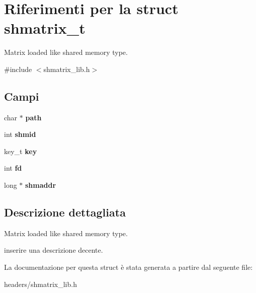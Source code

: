 \hypertarget{structshmatrix__t}{}\section{Riferimenti per la struct shmatrix\+\_\+t}
\label{structshmatrix__t}


Matrix loaded like shared memory type.  




{\ttfamily \#include $<$shmatrix\+\_\+lib.\+h$>$}

\subsection*{Campi}
\begin{DoxyCompactItemize}
\item 
\mbox{\label{structshmatrix__t_a3695e571dac87ca2667854366b54141e}} 
char $\ast$ {\bfseries path}
\item 
\mbox{\label{structshmatrix__t_a6fafeba2b1aae73a36fda9a012a49044}} 
int {\bfseries shmid}
\item 
\mbox{\label{structshmatrix__t_a1a81078d2e7a94e8ba6d3a98ac1a4155}} 
key\+\_\+t {\bfseries key}
\item 
\mbox{\label{structshmatrix__t_aa57d5cb8579cc4eedc468502def8c2e1}} 
int {\bfseries fd}
\item 
\mbox{\label{structshmatrix__t_a2e1a0de8e38807572e9bb1a53f8f598e}} 
long $\ast$ {\bfseries shmaddr}
\end{DoxyCompactItemize}


\subsection{Descrizione dettagliata}
Matrix loaded like shared memory type. 

inserire una descrizione decente. 

La documentazione per questa struct è stata generata a partire dal seguente file\+:\begin{DoxyCompactItemize}
\item 
headers/shmatrix\+\_\+lib.\+h\end{DoxyCompactItemize}
